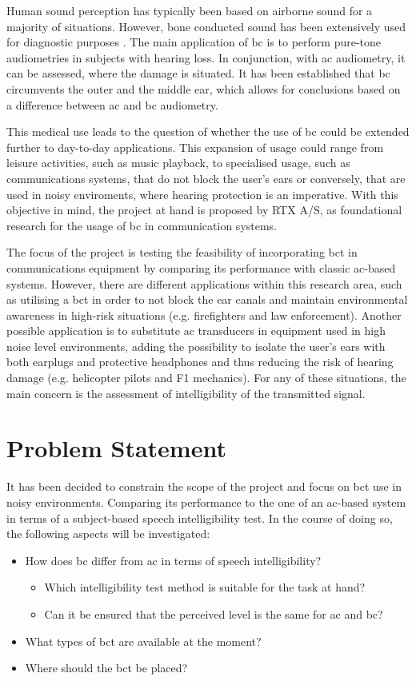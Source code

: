 Human sound perception has typically been based on airborne sound for a majority of situations. However, bone conducted sound has been extensively used for diagnostic purposes \citep{iso_389-3}. The main application of \gls{bc} is to perform pure-tone audiometries in subjects with hearing loss. In conjunction, with \gls{ac} audiometry, it can be assessed, where the damage is situated. It has been established that \gls{bc} circumvents the outer and the middle ear, which allows for conclusions based on a difference between \gls{ac} and \gls{bc} audiometry.

This medical use leads to the question of whether the use of \gls{bc} could be extended further to day-to-day applications. This expansion of usage could range from leisure activities, such as music playback, to specialised usage, such as communications systems, that do not block the user's ears or conversely, that are used in noisy enviroments, where hearing protection is an imperative. With this objective in mind, the project at hand is proposed by RTX A/S, as foundational research for the usage of \gls{bc} in communication systems.

The focus of the project is testing the feasibility of incorporating \gls{bct} in communications equipment by comparing its performance with classic \gls{ac}-based systems. However, there are different applications within this research area, such as utilising a \gls{bct} in order to not block the ear canals and maintain environmental awareness in high-risk situations (e.g. firefighters and law enforcement). Another possible application is to substitute \gls{ac} transducers in equipment used in high noise level environments, adding the possibility to isolate the user's ears with both earplugs and protective headphones and thus reducing the risk of hearing damage (e.g. helicopter pilots and F1 mechanics). For any of these situations, the main concern is the assessment of intelligibility of the transmitted signal.

\section{Problem Statement}
It has been decided to constrain the scope of the project and focus on \gls{bct} use in noisy environments. Comparing its performance to the one of an \gls{ac}-based system in terms of a subject-based speech intelligibility test. In the course of doing so, the following aspects will be investigated:
\begin{itemize}
\item How does \gls{bc} differ from \gls{ac} in terms of speech intelligibility?
\begin{itemize}
\item Which intelligibility test method is suitable for the task at hand?
\item Can it be ensured that the perceived level is the same for \gls{ac} and \gls{bc}?
\end{itemize}
\item What types of \gls{bct} are available at the moment?
\item Where should the \gls{bct} be placed?
\end{itemize}
